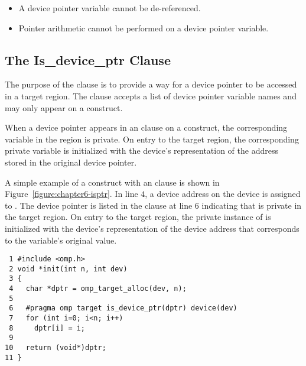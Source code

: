\begin{itemize}
  \item  A device pointer variable cannot be de-referenced.
  \item  Pointer arithmetic cannot be performed on a device pointer variable.
\end{itemize}

\subsection{The Is\_device\_ptr Clause}
\label{ssec:06.is_device_ptr-clause}

The purpose of the  clause is to provide a way for a device
pointer to be accessed in a target region.
The  clause accepts a list of device pointer variable names
and may only appear on a  construct.

When a device pointer appears in an  clause on a
 construct, the corresponding variable in the region is private.
On entry to the target region, the corresponding private variable is
initialized with the device's representation of the address stored in the
original device pointer.

A simple example of a  construct with an 
clause is shown in Figure~\ref{figure:chapter6-isptr}.  In line $4$, a device
address on the  device is assigned to .  The device pointer 
is listed in the  clause at line $6$ indicating that 
is private in the target region.  On entry to the target region, the private instance
of  is initialized with the  device's representation of the device
address that corresponds to the variable's original value.

\begin{figure*}[!tb]
\begin{verbatim}
 1 #include <omp.h>
 2 void *init(int n, int dev)
 3 {
 4   char *dptr = omp_target_alloc(dev, n);
 5 
 6   #pragma omp target is_device_ptr(dptr) device(dev) 
 7   for (int i=0; i<n; i++)
 8     dptr[i] = i;
 9 
10   return (void*)dptr;
11 }
\end{verbatim}
\caption{ \textbf {Example of the is\_device\_ptr clause} -- \small
          The device pointer variable \texttt{dptr} must appear in
          the \texttt{is\_device\_ptr} clause to 
          de-reference it in the target region.
        }
\label{figure:chapter6-isptr}
\end{figure*}

